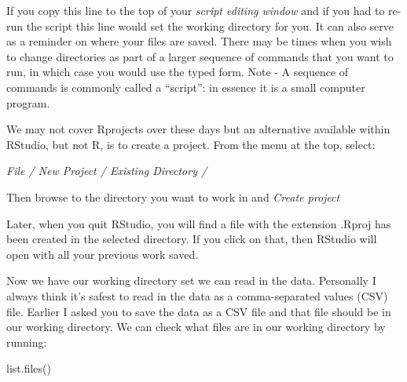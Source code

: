 \documentclass[
]{book}
\makeatletter
\newenvironment{Shaded}{\begin{snugshade}}{\end{snugshade}}
\newcommand{\FunctionTok}[1]{\textcolor[rgb]{0.00,0.00,0.00}{#1}}
\newcommand{\NormalTok}[1]{#1}
\newenvironment{kframe}{%
\medskip{}
\setlength{\fboxsep}{.8em}
 \def\at@end@of@kframe{}%
 \ifinner\ifhmode%
  \def\at@end@of@kframe{\end{minipage}}%
  \begin{minipage}{\columnwidth}%
 \fi\fi%
 \def\FrameCommand##1{\hskip\@totalleftmargin \hskip-\fboxsep
 \colorbox{shadecolor}{##1}\hskip-\fboxsep
     \hskip-\linewidth \hskip-\@totalleftmargin \hskip\columnwidth}%
 \MakeFramed {\advance\hsize-\width
   \@totalleftmargin\z@ \linewidth\hsize
   \@setminipage}}%
 {\par\unskip\endMakeFramed%
 \at@end@of@kframe}
\newenvironment{rmdblock}[1]
  {
  \begin{itemize}
  \renewcommand{\labelitemi}{
    \raisebox{-.7\height}[0pt][0pt]{
      {\setkeys{Gin}{width=3em,keepaspectratio}\texttt{[image: images/\#1]}}
    }
  }
  \setlength{\fboxsep}{1em}
  \begin{kframe}
  \item
  }
  {
  \end{kframe}
  \end{itemize}
  }
\newenvironment{rmdtip}
  {\begin{rmdblock}{tip}}
  {\end{rmdblock}}
\makeatother
\begin{document}
\begin{rmdtip}
If you copy this line to the top of your \emph{script editing window} and if you had to re-run the script this line would set the working directory for you. It can also serve as a reminder on where your files are saved. There may be times when you wish to change directories as part of a larger sequence of commands that you want to run, in which case you would use the typed form. Note - A sequence of commands is commonly called a ``script'': in essence it is a small computer program.
\end{rmdtip}

We may not cover Rprojects over these days but an alternative available within RStudio, but not R, is to create a project. From the menu at the top, select:

\emph{File / New Project / Existing Directory /}

Then browse to the directory you want to work in and \emph{Create project}

Later, when you quit RStudio, you will find a file with the extension .Rproj has been created in the selected directory. If you click on that, then RStudio will open with all your previous work saved.

Now we have our working directory set we can read in the data. Personally I always think it's safest to read in the data as a comma-separated values (CSV) file. Earlier I asked you to save the data as a CSV file and that file should be in our working directory. We can check what files are in our working directory by running:

\begin{Shaded}
\begin{Highlighting}[]
\FunctionTok{list.files}\NormalTok{()}
\end{Highlighting}
\end{Shaded}
\end{document}
